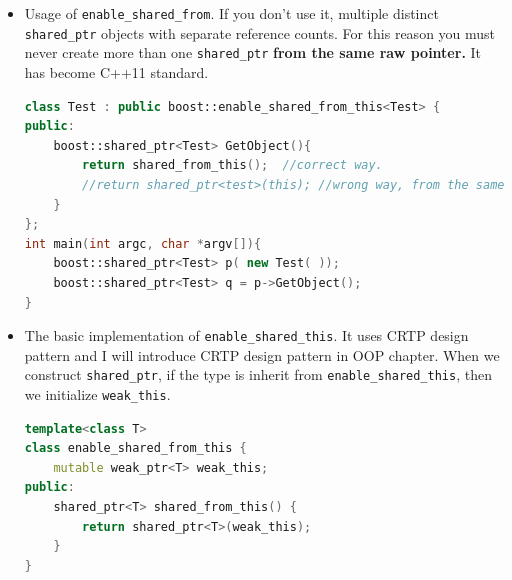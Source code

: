 \documentclass[a4paper,11pt,twoside]{book}
\begin{document}
\begin{itemize}
\item Usage of \texttt{enable\_shared\_from}. If you don't use it, multiple distinct \texttt{shared\_ptr} objects with separate reference counts. For this reason you must never create more than one \texttt{shared\_ptr} \textbf{from the same raw pointer.} It has become C++11 standard.
\begin{lstlisting}[frame=single, language=c++]
class Test : public boost::enable_shared_from_this<Test> {
public:
    boost::shared_ptr<Test> GetObject(){
        return shared_from_this();  //correct way.
        //return shared_ptr<test>(this); //wrong way, from the same raw pointer.
    }
};
int main(int argc, char *argv[]){
    boost::shared_ptr<Test> p( new Test( ));
    boost::shared_ptr<Test> q = p->GetObject();
}
\end{lstlisting}
	\item The basic implementation of \texttt{enable\_shared\_this}. It uses CRTP design pattern and I will introduce CRTP design pattern in OOP chapter.  When we construct \texttt{shared\_ptr}, if the type is inherit from \texttt{enable\_shared\_this}, then we initialize \texttt{weak\_this}. 
\begin{lstlisting}[frame=single, language=c++]
template<class T>
class enable_shared_from_this {
	mutable weak_ptr<T> weak_this;
public:
	shared_ptr<T> shared_from_this() {
		return shared_ptr<T>(weak_this); 
	}
}
\end{lstlisting}

\end{itemize}
\end{document}
